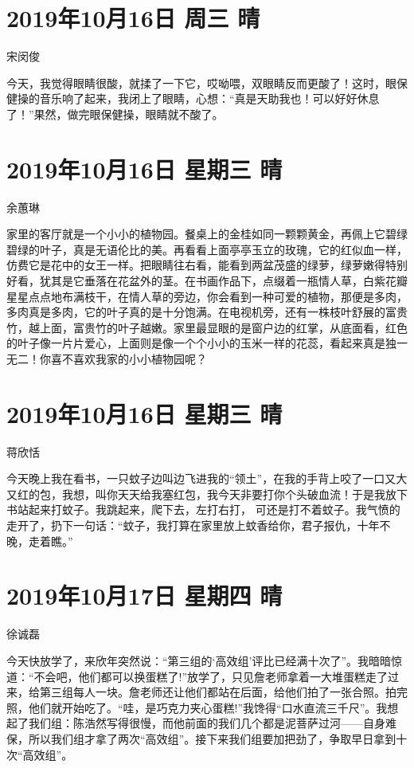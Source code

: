 \section{2019年10月16日 周三 晴}

宋闵俊

今天，我觉得眼睛很酸，就揉了一下它，哎呦喂，双眼睛反而更酸了！这时，眼保健操的音乐响了起来，我闭上了眼睛，心想：“真是天助我也！可以好好休息了！”果然，做完眼保健操，眼睛就不酸了。

\section{2019年10月16日 星期三 晴}

余蕙琳

家里的客厅就是一个小小的植物园。餐桌上的金桂如同一颗颗黄金，再佩上它碧绿碧绿的叶子，真是无语伦比的美。再看看上面亭亭玉立的玫瑰，它的红似血一样，仿费它是花中的女王一样。把眼睛往右看，能看到两盆茂盛的绿萝，绿萝嫩得特别好看，犹其是它垂落在花盆外的茎。在书画作品下，点缀着一瓶情人草，白紫花瓣星星点点地布满枝干，在情人草的旁边，你会看到一种可爱的植物，那便是多肉，多肉真是多肉，它的叶子真的是十分饱满。在电视机旁，还有一株枝叶舒展的富贵竹，越上面，富贵竹的叶子越嫩。家里最显眼的是窗户边的红掌，从底面看，红色的叶子像一片片爱心，上面则是像一个个小小的玉米一样的花蕊，看起来真是独一无二！你喜不喜欢我家的小小植物园呢？

\section{2019年10月16日 星期三 晴}

蒋欣恬

今天晚上我在看书，一只蚊子边叫边飞进我的“领土”，在我的手背上咬了一口又大又红的包，我想，叫你天天给我塞红包，我今天非要打你个头破血流！于是我放下书站起来打蚊子。我跳起来，爬下去，左打右打，
可还是打不着蚊子。我气愤的走开了，扔下一句话：“蚊子，我打算在家里放上蚊香给你，君子报仇，十年不晚，走着瞧。”

\section{2019年10月17日 星期四 晴}

徐诚磊

今天快放学了，来欣年突然说：“第三组的`高效组'评比已经满十次了”。我暗暗惊道：“不会吧，他们都可以换蛋糕了!”放学了，只见詹老师拿着一大堆蛋糕走了过来，给第三组每人一块。詹老师还让他们都站在后面，给他们拍了一张合照。拍完照，他们就开始吃了。“哇，是巧克力夹心蛋糕!”我馋得“口水直流三千尺”。我想起了我们组：陈浩然写得很慢，而他前面的我们几个都是泥菩萨过河——自身难保，所以我们组才拿了两次“高效组”。接下来我们组要加把劲了，争取早日拿到十次“高效组”。


